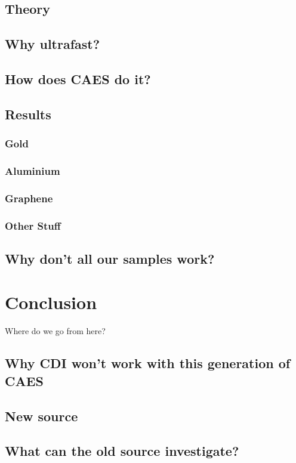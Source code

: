 \section{Theory}

\section{Why ultrafast?}

\section{How does CAES do it?}

\section{Results}

\subsection{Gold}

\subsection{Aluminium}

\subsection{Graphene}

\subsection{Other Stuff}

\section{Why don't all our samples work?}





\chapter{Conclusion}

Where do we go from here?

\section{Why CDI won't work with this generation of CAES}

\section{New source}

\section{What can the old source investigate?}



